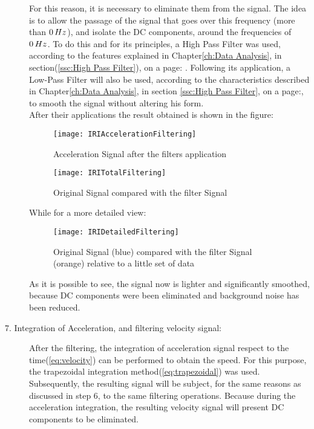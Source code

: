 \documentclass[tesi]{subfiles}
\begin{document}
\begin{description}
For this reason, it is necessary to eliminate them from the signal. The idea is to allow the passage of the signal that goes over this frequency (more than $0 \thinspace Hz$), and isolate the DC components, around the frequencies of $0 \thinspace Hz$. To do this and for its principles, a High Pass Filter was used, according to the features explained in Chapter\ref{ch:Data Analysis}, in section(\ref{ssc:High Pass Filter}), on a page: \pageref{ssc:High Pass Filter}. 
Following its application, a Low-Pass Filter will also be used, according to the characteristics described in Chapter\ref{ch:Data Analysis}, in section \ref{ssc:High Pass Filter}, on a page:\pageref{ssc:Low Pass Filter}, to smooth the signal without altering his form.\\

After their applications the result obtained is shown in the figure:\\
\begin{figure}[H]
\centering
\texttt{[image: IRIAccelerationFiltering]}
\caption{Acceleration Signal after the filters application}
\end{figure}

\begin{figure}[H]
\centering
\texttt{[image: IRITotalFiltering]}
\caption{Original Signal compared with the filter Signal}
\end{figure}
While for a more detailed view:\\

\begin{figure}[H]
\centering
\texttt{[image: IRIDetailedFiltering]}
\caption{Original Signal (blue) compared with the filter Signal (orange) relative to a little set of data}
\end{figure}

\noindent As it is possible to see, the signal now is lighter and significantly smoothed, because DC components were been eliminated and background noise has been reduced.
\item[7. Integration of Acceleration, and filtering velocity signal:] After the filtering, the integration of acceleration signal respect to the time(\ref{eq:velocity}) can be performed to obtain the speed. For this purpose, the trapezoidal integration method(\ref{eq:trapezoidal}) was used. Subsequently, the resulting signal will be subject, for the same reasons as discussed in step 6, to the same filtering operations. Because during the acceleration integration, the resulting velocity signal will present DC components to be eliminated.\\


\end{description}
\end{document}
